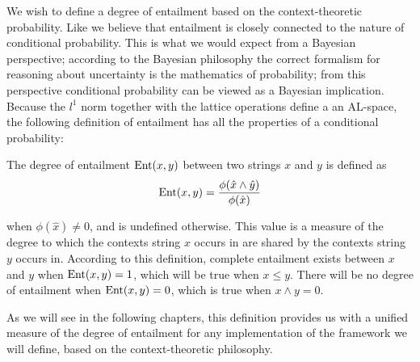  We wish to define a degree of entailment based on the context-theoretic probability. Like \cite{Glickman:05} we believe that entailment is closely connected to the nature of conditional probability. This is what we would expect from a Bayesian perspective; according to the Bayesian philosophy the correct formalism for reasoning about uncertainty is the mathematics of probability; from this perspective conditional probability can be viewed as a Bayesian implication. Because the $l^1$ norm together with the lattice operations define a an AL-space, the following definition of entailment has all the properties of a conditional probability:
\begin{defn}
The degree of entailment $\operatorname{Ent}(x,y)$ between two strings $x$ and $y$ is defined as
$$\operatorname{Ent}(x,y) = \frac{\phi(\hat{x}\land\hat{y})}{\phi(\hat{x})}$$
\end{defn}\noindent
when $\phi(\hat{x}) \neq 0$, and is undefined otherwise. This value is a measure of the degree to which the contexts string $x$ occurs in are shared by the contexts string $y$ occurs in.  According to this definition, complete entailment exists between $x$ and $y$ when $\operatorname{Ent}(x,y) = 1$, which will be true when $x \le y$. There will be no degree of entailment when $\operatorname{Ent}(x,y) = 0$, which is true when $x \land y = 0$.

As we will see in the following chapters, this definition provides us with a unified measure of the degree of entailment for any implementation of the framework we will define, based on the context-theoretic philosophy.



%


